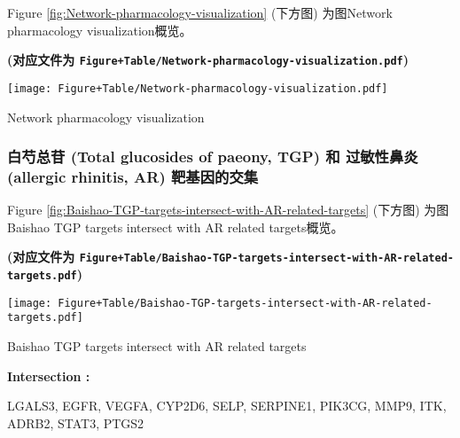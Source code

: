 \documentclass[
]{article}
\begin{document}
Figure \ref{fig:Network-pharmacology-visualization} (下方图) 为图Network pharmacology visualization概览。

\textbf{(对应文件为 \texttt{Figure+Table/Network-pharmacology-visualization.pdf})}

\def\@captype{figure}
\begin{center}
\texttt{[image: Figure+Table/Network-pharmacology-visualization.pdf]}
\caption{Network pharmacology visualization}\label{fig:Network-pharmacology-visualization}
\end{center}

\hypertarget{ux767dux828dux603bux82f7-total-glucosides-of-paeony-tgp-ux548c-ux8fc7ux654fux6027ux9f3bux708e-allergic-rhinitis-ar-ux9776ux57faux56e0ux7684ux4ea4ux96c6}{%
\subsubsection{白芍总苷 (Total glucosides of paeony, TGP) 和 过敏性鼻炎 (allergic rhinitis, AR) 靶基因的交集}\label{ux767dux828dux603bux82f7-total-glucosides-of-paeony-tgp-ux548c-ux8fc7ux654fux6027ux9f3bux708e-allergic-rhinitis-ar-ux9776ux57faux56e0ux7684ux4ea4ux96c6}}

Figure \ref{fig:Baishao-TGP-targets-intersect-with-AR-related-targets} (下方图) 为图Baishao TGP targets intersect with AR related targets概览。

\textbf{(对应文件为 \texttt{Figure+Table/Baishao-TGP-targets-intersect-with-AR-related-targets.pdf})}

\def\@captype{figure}
\begin{center}
\texttt{[image: Figure+Table/Baishao-TGP-targets-intersect-with-AR-related-targets.pdf]}
\caption{Baishao TGP targets intersect with AR related targets}\label{fig:Baishao-TGP-targets-intersect-with-AR-related-targets}
\end{center}
\begin{center}\begin{tcolorbox}[colback=gray!10, colframe=gray!50, width=0.9\linewidth, arc=1mm, boxrule=0.5pt]
\textbf{
Intersection
:}

\vspace{0.5em}

    LGALS3, EGFR, VEGFA, CYP2D6, SELP, SERPINE1, PIK3CG,
MMP9, ITK, ADRB2, STAT3, PTGS2

\vspace{2em}
\end{tcolorbox}
\end{center}
\end{document}
